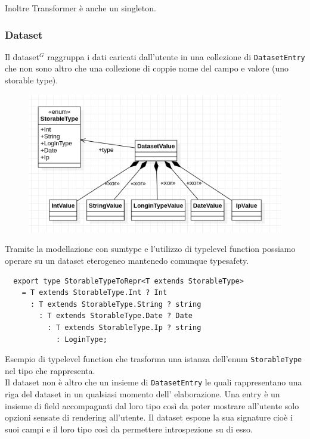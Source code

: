 Inoltre Transformer è anche un singleton.

\subsubsection{Dataset}
Il dataset$^{G}$ raggruppa i dati caricati dall'utente in una collezione di
\texttt{DatasetEntry} che non sono altro che una collezione di coppie nome del
campo e valore (uno storable type). \\
\begin{figure}[H]
  \centering
  \includegraphics[scale=0.65]{../../assets/classi_uml/datasetentrypng.png}
\end{figure}
Tramite la modellazione con sumtype e l'utilizzo di typelevel function
possiamo operare su un dataset eterogeneo mantenedo comunque typesafety.
\begin{verbatim}
  export type StorableTypeToRepr<T extends StorableType>
    = T extends StorableType.Int ? Int
      : T extends StorableType.String ? string
        : T extends StorableType.Date ? Date
          : T extends StorableType.Ip ? string
            : LoginType;
\end{verbatim}
Esempio di typelevel function che trasforma una istanza dell'enum
\texttt{StorableType} nel tipo che rappresenta.
\\

\noindent
Il dataset non è altro che un insieme di \texttt{DatasetEntry} le quali rappresentano
una riga del dataset in un qualsiasi momento dell' elaborazione. Una entry è un
insieme di field accompagnati dal loro tipo così da poter mostrare all'utente
solo opzioni sensate di rendering all'utente. Il dataset espone la sua signature
cioè i suoi campi e il loro tipo così da permettere introspezione su di esso.\\

